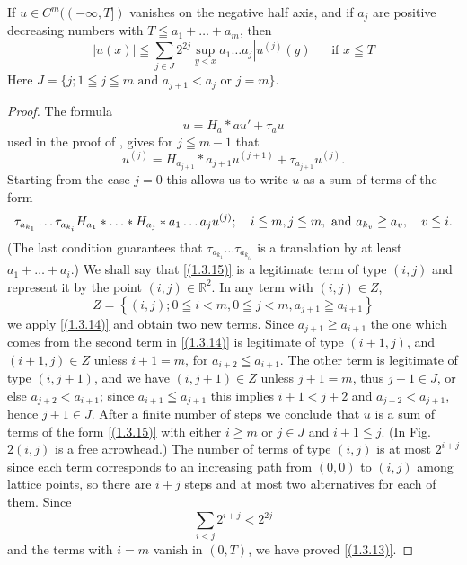 \begin{lemma}
    If $u \in C^{m}((-\infty, T])$ vanishes on the negative half axis, and if $a_{j}$ are positive decreasing numbers with $T \leqq a_{1}+\ldots+a_{m}$, then
\begin{equation}
    \label{(1.3.13)}
    |u(x)| \leqq \sum_{j \in J} 2^{2 j} \sup _{y<x} a_{1} \ldots a_{j}\left|u^{(j)}(y)\right| \quad\text{ if }x \leqq T
\end{equation}
Here $J=\{j ; 1 \leqq j \leqq m \text{ and } a_{j+1}<a_{j} \text{ or } j=m\}$.
\end{lemma}

\begin{proof}
    The formula
\[
	u=H_{a} * a u'+\tau_{a} u
\]
used in the proof of , gives for $j \leqq m-1$ that
\begin{equation}
    \label{(1.3.14)}
    u^{(j)}=H_{a_{j+1}} * a_{j+1} u^{(j+1)}+\tau_{a_{j+1}} u^{(j)} .
\end{equation}
Starting from the case $j=0$ this allows us to write $u$ as a sum of terms of the form
\begin{equation}
    \label{(1.3.15)}
\tau_{a_{k_1}} \ldots \tau_{a_{k_i}} H_{a_1} * \ldots * H_{a_j} * a_1 \ldots a_j u^{(j)} ; \quad i \leqq m, j \leqq m, \\
\text { and } a_{k_v} \geqq a_v, \quad v \leqq i .
\end{equation}
(The last condition guarantees that $\tau_{a_{k_1}} \ldots \tau_{a_{k_{i_1}}}$ is a translation by at least $a_1+\ldots+a_i$.) We shall say that \eqref{(1.3.15)} is a legitimate term of type $(i, j)$ and represent it by the point $(i, j) \in \mathbb{R}^2$. In any term with $(i, j) \in Z$,
\[
Z=\left\{(i, j) ; 0 \leqq i<m, 0 \leqq j<m, a_{j+1} \geqq a_{i+1}\right\}
\]
we apply \eqref{(1.3.14)} and obtain two new terms. Since $a_{j+1} \geqq a_{i+1}$ the one which comes from the second term in \eqref{(1.3.14)} is legitimate of type $(i+1, j)$, and $(i+1, j) \in Z$ unless $i+1=m$, for $a_{i+2} \leqq a_{i+1}$. The other term is legitimate of type $(i, j+1)$, and we have $(i, j+1) \in Z$ unless $j+1=m$, thus $j+1 \in J$, or else $a_{j+2}<a_{i+1}$; since $a_{i+1} \leqq a_{j+1}$ this implies $i+1<j +2$ and $a_{j+2}<a_{j+1}$, hence $j+1 \in J$. After a finite number of steps we conclude that $u$ is a sum of terms of the form \eqref{(1.3.15)} with either $i \geqq m$ or $j \in J$ and $i+1 \leqq j$. (In Fig. $2(i, j)$ is a free arrowhead.) The number of terms of type $(i, j)$ is at most $2^{i+j}$ since each term corresponds to an increasing path from $(0,0)$ to $(i, j)$ among lattice points, so there are $i+j$ steps and at most two alternatives for each of them. Since
\[
	\sum_{i<j} 2^{i+j}<2^{2 j}
\]
and the terms with $i=m$ vanish in $(0, T)$, we have proved \eqref{(1.3.13)}.
\end{proof}

